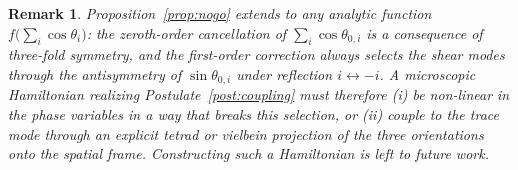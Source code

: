 \documentclass[a4paper,fleqn]{cas-dc}
\theoremstyle{thmstyleone}%
\theoremstyle{thmstyletwo}%
\newtheorem{remark}{Remark}%
\begin{document}
\begin{remark}
Proposition~\ref{prop:nogo} extends to any analytic function
$f\bigl(\sum_i\cos\theta_i\bigr)$: the zeroth-order cancellation
of $\sum_i\cos\theta_{0,i}$ is a consequence of three-fold
symmetry, and the first-order correction always selects the
shear modes through the antisymmetry of $\sin\theta_{0,i}$
under reflection $i\leftrightarrow -i$. A microscopic
Hamiltonian realizing Postulate~\ref{post:coupling} must
therefore (i) be non-linear in the phase variables in a way
that breaks this selection, or (ii) couple to the trace mode
through an explicit tetrad or vielbein projection of the three
orientations onto the spatial frame. Constructing such a
Hamiltonian is left to future work.
\end{remark}






\printcredits

\end{document}
